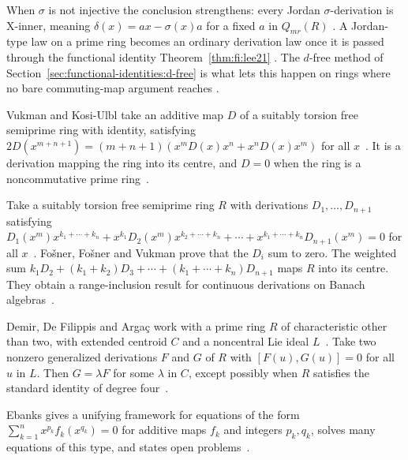 When $\sigma$ is not injective the conclusion strengthens: every Jordan
$\sigma$-derivation is X-inner, meaning $\delta(x)=ax-\sigma(x)a$ for a
fixed $a$ in $Q_{mr}(R)$ \cite[Theorem~2.4, p.~3]{LeeTK2015JordanFI}.
A Jordan-type law on a prime ring becomes an ordinary derivation law once
it is passed through the functional identity Theorem~\ref{thm:fi:lee21}
\cite[p.~221]{LeeTK2015JordanFI}. The $d$-free method of
Section~\ref{sec:functional-identities:d-free} is what lets this happen on
rings where no bare commuting-map argument reaches
\cite[p.~x]{BresarMartindaleChebotar2007FI}.

Vukman and Kosi-Ulbl take an additive map $D$ of a suitably torsion free
semiprime ring with identity, satisfying
$2D(x^{m+n+1})=(m+n+1)(x^mD(x)x^n+x^nD(x)x^m)$ for all $x$~\cite{WlOnSomeEquationsRelatedToDeriva2006}. It is a derivation
mapping the ring into its centre, and $D=0$ when the ring is a
noncommutative prime ring~\cite{WlOnSomeEquationsRelatedToDeriva2006}.

Take a suitably torsion free semiprime ring $R$ with derivations
$D_1,\dots,D_{n+1}$ satisfying
$D_1(x^m)x^{k_1+\cdots+k_n}+x^{k_1}D_2(x^m)x^{k_2+\cdots+k_n}+\cdots+x^{k_1+\cdots+k_n}D_{n+1}(x^m)=0$
for all $x$~\cite{WlAnIdentityWithDerivationsOnRin2008}. Fo\v{s}ner, Fo\v{s}ner and Vukman prove that the $D_i$ sum to
zero. The weighted sum %
$k_1D_2+(k_1+k_2)D_3+\cdots+(k_1+\cdots+k_n)D_{n+1}$ maps $R$ into its centre.
They obtain a range-inclusion result for continuous derivations on Banach
algebras~\cite{WlAnIdentityWithDerivationsOnRin2008}.

Demir, De Filippis and Arga\c{c} work with a prime ring $R$ of characteristic
other than two, with extended centroid $C$ and a noncentral Lie ideal $L$~\cite{WlAQuadraticGeneralizedDifferent2020}.
Take
two nonzero generalized derivations $F$ and $G$ of $R$ with $[F(u),G(u)]=0$
for all $u$ in $L$. Then $G=\lambda F$ for some $\lambda$ in $C$, except
possibly when $R$ satisfies the standard identity of degree
four~\cite{WlAQuadraticGeneralizedDifferent2020}.

Ebanks gives a unifying framework for equations of the form
$\sum_{k=1}^{n}x^{p_k}f_k(x^{q_k})=0$ for additive maps $f_k$ and integers
$p_k,q_k$, solves many equations of this type, and states open
problems~\cite{WlCharacterizingRingDerivationsO2014}.
